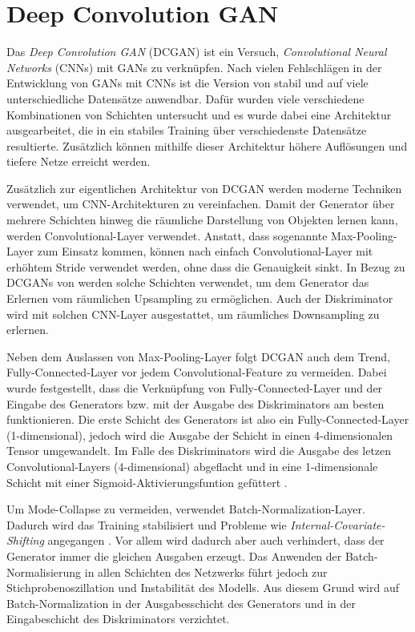 \section{Deep Convolution GAN}
Das \textit{Deep Convolution GAN} (DCGAN) ist ein Versuch,
\textit{Convolutional Neural Networks} (CNNs) mit GANs zu verknüpfen. Nach
vielen Fehlschlägen in der Entwicklung von GANs mit CNNs ist die Version von
\cite{radford2016unsupervised} stabil und auf viele unterschiedliche
Datensätze anwendbar. Dafür wurden viele verschiedene Kombinationen von
Schichten untersucht und es wurde dabei eine Architektur ausgearbeitet, die
in ein stabiles Training über verschiedenste Datensätze resultierte.
Zusätzlich können mithilfe dieser Architektur höhere Auflösungen und tiefere
Netze erreicht werden.

Zusätzlich zur eigentlichen Architektur von DCGAN werden moderne Techniken
verwendet, um CNN-Architekturen zu vereinfachen.  Damit der Generator über
mehrere Schichten hinweg die räumliche Darstellung von Objekten lernen kann,
werden Convolutional-Layer verwendet. Anstatt, dass sogenannte
Max-Pooling-Layer zum Einsatz kommen, können nach
\cite{springenberg2015striving} einfach Convolutional-Layer mit erhöhtem
Stride verwendet werden, ohne dass die Genauigkeit sinkt. In Bezug zu DCGANs
von \cite{radford2016unsupervised} werden solche Schichten verwendet, um dem
Generator das Erlernen vom räumlichen Upsampling zu ermöglichen. Auch der
Diskriminator wird mit solchen CNN-Layer ausgestattet, um räumliches
Downsampling zu erlernen.

Neben dem Auslassen von Max-Pooling-Layer folgt DCGAN auch dem Trend,
Fully-Connected-Layer vor jedem Convolutional-Feature zu vermeiden. Dabei
wurde festgestellt, dass die Verknüpfung von Fully-Connected-Layer und der
Eingabe des Generators bzw. mit der Ausgabe des Diskriminators am besten
funktionieren. Die erste Schicht des Generators ist also ein
Fully-Connected-Layer (1-dimensional), jedoch wird die Ausgabe der Schicht in
einen 4-dimensionalen Tensor umgewandelt. Im Falle des Diskriminators wird die
Ausgabe des letzen Convolutional-Layers (4-dimensional) abgeflacht und in eine
1-dimensionale Schicht mit einer Sigmoid-Aktivierungsfuntion gefüttert
\cite{radford2016unsupervised}.

Um Mode-Collapse zu vermeiden, verwendet \cite{radford2016unsupervised}
Batch-Normalization-Layer. Dadurch wird das Training stabilisiert und Probleme
wie \textit{Internal-Covariate-Shifting} angegangen \cite{pmlr-v37-ioffe15}.
Vor allem wird dadurch aber auch verhindert, dass der Generator immer die
gleichen Ausgaben erzeugt. Das Anwenden der Batch-Normalisierung in allen
Schichten des Netzwerks führt jedoch zur Stichprobenoszillation und
Instabilität des Modells. Aus diesem Grund wird auf Batch-Normalization in der
Ausgabesschicht des Generators und in der Eingabeschicht des Diskriminators
verzichtet.

